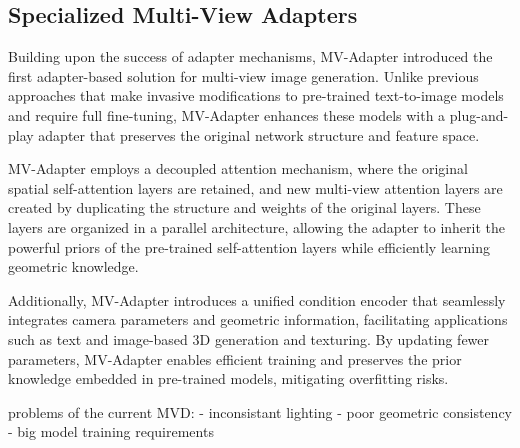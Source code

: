 \subsection{Specialized Multi-View Adapters}

Building upon the success of adapter mechanisms, MV-Adapter
\cite{mvadapter} introduced the first adapter-based solution for
multi-view image generation. Unlike previous approaches that make
invasive modifications to pre-trained text-to-image models and
require full fine-tuning, MV-Adapter enhances these models with a
plug-and-play adapter that preserves the original network structure
and feature space.

MV-Adapter employs a decoupled attention mechanism, where the
original spatial self-attention layers are retained, and new
multi-view attention layers are created by duplicating the structure
and weights of the original layers. These layers are organized in a
parallel architecture, allowing the adapter to inherit the powerful
priors of the pre-trained self-attention layers while efficiently
learning geometric knowledge.

Additionally, MV-Adapter introduces a unified condition encoder that
seamlessly integrates camera parameters and geometric information,
facilitating applications such as text and image-based 3D generation
and texturing. By updating fewer parameters, MV-Adapter enables
efficient training and preserves the prior knowledge embedded in
pre-trained models, mitigating overfitting risks.

problems of the current MVD:
- inconsistant lighting
- poor geometric consistency
- big model training requirements